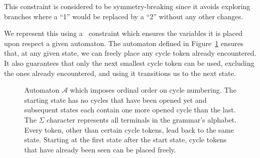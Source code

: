 \documentclass[../Document.tex]{subfiles}
\begin{document}
This constraint is considered to be symmetry-breaking since it avoids exploring branches where a ``1'' would be replaced by a ``2'' without any other changes.

We represent this using a \regular\ constraint which ensures the variables it is placed upon respect a given automaton. The automaton defined in Figure~\ref{fig:cycleCountingAutomaton} ensures that, at any given state, we can freely place any cycle token already encountered. It also guarantees that only the next smallest cycle token can be used, excluding the ones already encountered, and using it transitions us to the next state.

\begin{figure}[ht]
    \centering
    \caption[Automaton $\mathcal{A}$ which imposes ordinal order on cycle numbering.]{Automaton $\mathcal{A}$ which imposes ordinal order on cycle numbering. The starting state has no cycles that have been opened yet and subsequent states each contain one more opened cycle than the last. The $\Sigma$ character represents all terminals in the grammar's alphabet. Every token, other than certain cycle tokens, lead back to the same state. Starting at the first state after the start state, cycle tokens that have already been seen can be placed freely.}
    \label{fig:cycleCountingAutomaton}
\end{figure}
\end{document}
